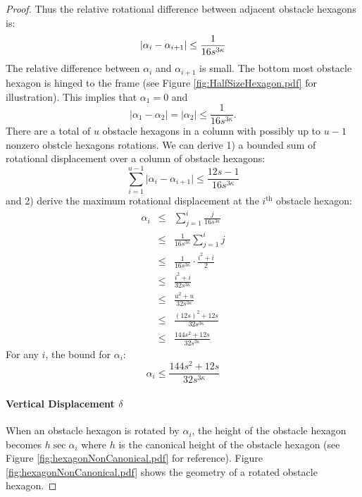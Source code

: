 \documentclass[10pt]{CSUNthesis}
\theoremstyle{plain}%
\theoremstyle{definition}
\theoremstyle{remark}
\newcommand{\ith}{i^\text{th}}
\newcommand{\lr}[1]{\left( #1 \right)}
\newcommand{\vlr}[1]{\left\vert #1 \right\vert}
\begin{document}
\begin{proof}
Thus the relative rotational difference between adjacent obstacle hexagons is:
\begin{equation}\label{eqn:angularBound}
\left\vert \alpha_i - \alpha_{i+1} \right\vert \leq \frac{1}{16s^{3\kappa}}\\
\end{equation}
The relative difference between $\alpha_i$ and $\alpha_{i+1}$ is small.
The bottom most obstacle hexagon is hinged to the frame (see Figure \ref{fig:HalfSizeHexagon.pdf} for illustration). 
This implies that $\alpha_1 = 0$ and
$$\vlr{\alpha_1 - \alpha_2}=\vlr{\alpha_2}\leq \frac{1}{16s^{3\kappa}}.$$
There are a total of $u$ obstacle hexagons in a column with possibly up to $u-1$ nonzero obstcle hexagons rotations.
We can derive 1) a bounded sum of rotational displacement over a column of obstacle hexagons:
\begin{equation}\label{eqn:angularSumBound}
\sum_{i=1}^{u-1} \vert \alpha_i - \alpha_{i+1} \vert \leq \frac{12s-1}{16s^{3\kappa}}
\end{equation}
and 2) derive the maximum rotational displacement at the $\ith$ obstacle hexagon:
\begin{eqnarray*}
\alpha_i &\leq& \sum_{j=1}^i \frac{j}{16s^{3\kappa}}\\
&\leq&\frac{1}{16s^{3\kappa}}\sum_{j=1}^i j\\
&\leq&\frac{1}{16s^{3\kappa}}\cdot \frac{i^2+i}{2}\\
&\leq&\frac{i^2+i}{32s^{3\kappa}}\\
&\leq&\frac{u^2+u}{32s^{3\kappa}}\\
&\leq&\frac{(12s)^2+12s}{32s^{3\kappa}}\\
&\leq&\frac{144s^2+12s}{32s^{3\kappa}}
\end{eqnarray*}
For any $i$, the bound for $\alpha_i$:
\begin{equation}\label{eqn:angularMaxBound}
\alpha_i \leq \frac{144s^2+12s}{32s^{3\kappa}}
\end{equation}


\paragraph{Vertical Displacement $\delta$}

When an obstacle hexagon is rotated by $\alpha_i$, the height of the obstacle hexagon becomes $h \sec \alpha_i$ where $h$ is the canonical height of the obstacle hexagon (see Figure \ref{fig:hexagonNonCanonical.pdf} for reference).
Figure \ref{fig:hexagonNonCanonical.pdf} shows the geometry of a rotated obstacle hexagon.


\end{proof}
\end{document}
